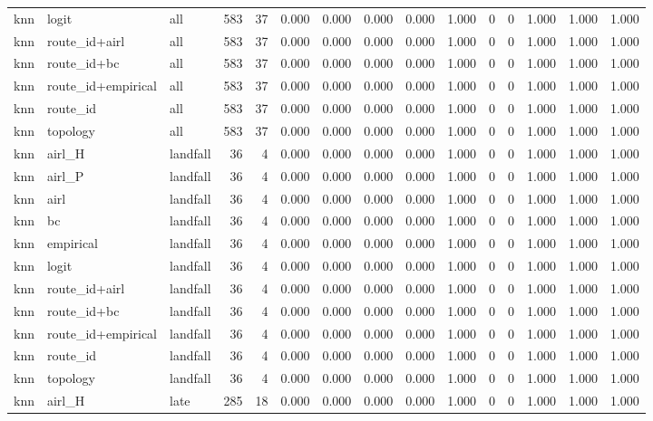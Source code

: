 \begin{tabular}{lllrrrrrrrrrrrr}
knn & logit & all & 583 & 37 & 0.000 & 0.000 & 0.000 & 0.000 & 1.000 & 0 & 0 & 1.000 & 1.000 & 1.000 \\
knn & route_id+airl & all & 583 & 37 & 0.000 & 0.000 & 0.000 & 0.000 & 1.000 & 0 & 0 & 1.000 & 1.000 & 1.000 \\
knn & route_id+bc & all & 583 & 37 & 0.000 & 0.000 & 0.000 & 0.000 & 1.000 & 0 & 0 & 1.000 & 1.000 & 1.000 \\
knn & route_id+empirical & all & 583 & 37 & 0.000 & 0.000 & 0.000 & 0.000 & 1.000 & 0 & 0 & 1.000 & 1.000 & 1.000 \\
knn & route_id & all & 583 & 37 & 0.000 & 0.000 & 0.000 & 0.000 & 1.000 & 0 & 0 & 1.000 & 1.000 & 1.000 \\
knn & topology & all & 583 & 37 & 0.000 & 0.000 & 0.000 & 0.000 & 1.000 & 0 & 0 & 1.000 & 1.000 & 1.000 \\
knn & airl_H & landfall & 36 & 4 & 0.000 & 0.000 & 0.000 & 0.000 & 1.000 & 0 & 0 & 1.000 & 1.000 & 1.000 \\
knn & airl_P & landfall & 36 & 4 & 0.000 & 0.000 & 0.000 & 0.000 & 1.000 & 0 & 0 & 1.000 & 1.000 & 1.000 \\
knn & airl & landfall & 36 & 4 & 0.000 & 0.000 & 0.000 & 0.000 & 1.000 & 0 & 0 & 1.000 & 1.000 & 1.000 \\
knn & bc & landfall & 36 & 4 & 0.000 & 0.000 & 0.000 & 0.000 & 1.000 & 0 & 0 & 1.000 & 1.000 & 1.000 \\
knn & empirical & landfall & 36 & 4 & 0.000 & 0.000 & 0.000 & 0.000 & 1.000 & 0 & 0 & 1.000 & 1.000 & 1.000 \\
knn & logit & landfall & 36 & 4 & 0.000 & 0.000 & 0.000 & 0.000 & 1.000 & 0 & 0 & 1.000 & 1.000 & 1.000 \\
knn & route_id+airl & landfall & 36 & 4 & 0.000 & 0.000 & 0.000 & 0.000 & 1.000 & 0 & 0 & 1.000 & 1.000 & 1.000 \\
knn & route_id+bc & landfall & 36 & 4 & 0.000 & 0.000 & 0.000 & 0.000 & 1.000 & 0 & 0 & 1.000 & 1.000 & 1.000 \\
knn & route_id+empirical & landfall & 36 & 4 & 0.000 & 0.000 & 0.000 & 0.000 & 1.000 & 0 & 0 & 1.000 & 1.000 & 1.000 \\
knn & route_id & landfall & 36 & 4 & 0.000 & 0.000 & 0.000 & 0.000 & 1.000 & 0 & 0 & 1.000 & 1.000 & 1.000 \\
knn & topology & landfall & 36 & 4 & 0.000 & 0.000 & 0.000 & 0.000 & 1.000 & 0 & 0 & 1.000 & 1.000 & 1.000 \\
knn & airl_H & late & 285 & 18 & 0.000 & 0.000 & 0.000 & 0.000 & 1.000 & 0 & 0 & 1.000 & 1.000 & 1.000 \\

\end{tabular}
